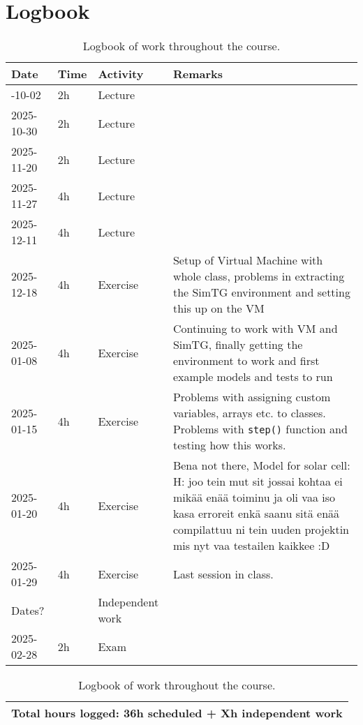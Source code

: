 \section{Logbook}
\label{sec:logbook}




\begin{table}[H]
\centering
    \begin{tabularx}{\textwidth} {
    | >{\hsize=0.45\hsize}X 
    | >{\hsize=0.45\hsize}X 
    | >{\hsize=0.5\hsize}X 
    | >{\hsize=1.6\hsize}X
    |}
    \hline
    \textbf{Date} & \textbf{Time} & \textbf{Activity} & \textbf{Remarks} \\ \hline\hline
        2025-10-02 & 2h & Lecture  &  \\ \hline
        
        2025-10-30 & 2h & Lecture  &  \\ \hline
        
        2025-11-20 & 2h & Lecture  &  \\ \hline
        
        2025-11-27 & 4h & Lecture  &  \\ \hline
        
        2025-12-11 & 4h & Lecture  &  \\ \hline
        
        2025-12-18 & 4h & Exercise & Setup of Virtual Machine with whole class, problems in extracting the SimTG environment and setting this up on the VM \\ \hline
        
        2025-01-08 & 4h & Exercise & Continuing to work with VM and SimTG, finally getting the environment to work and first example models and tests to run \\ \hline

        2025-01-15 & 4h & Exercise & Problems with assigning custom variables, arrays etc. to classes. Problems with \texttt{step()} function and testing how this works. \\ \hline
        
        2025-01-20 & 4h & Exercise & Bena not there, Model for solar cell: H: joo tein mut sit jossai kohtaa ei mikää enää toiminu ja oli vaa iso kasa erroreit enkä saanu sitä enää compilattuu ni tein uuden projektin mis nyt vaa testailen kaikkee :D\\ \hline
        
        2025-01-29 & 4h & Exercise & Last session in class.  \\ \hline
        
        Dates?     && Independent work & \\ \hline
        
        2025-02-28 & 2h & Exam &  \\ \hline
    \end{tabularx}
    \begin{tabularx}{\textwidth} {|X|}
         \hline
         \textbf{Total hours logged: 36h scheduled + Xh independent work} \\ \hline
    \end{tabularx}

    
    \caption{Logbook of work throughout the course.}
    \label{tab:logbook}
\end{table}